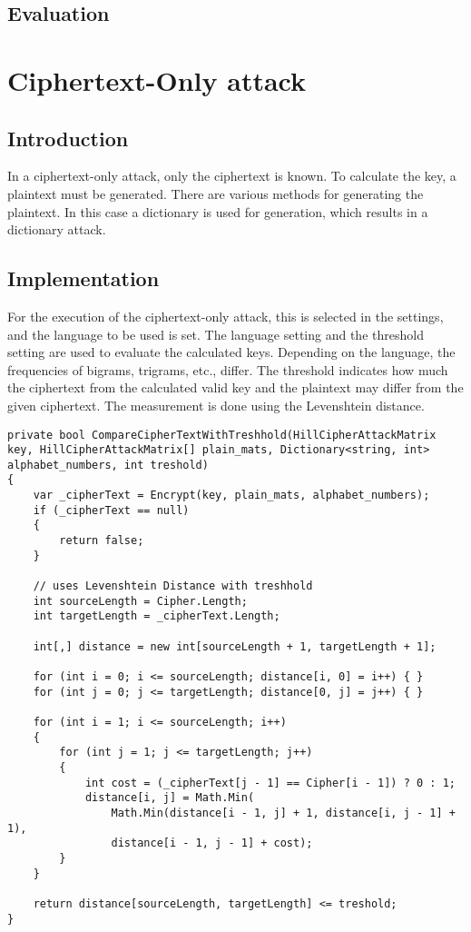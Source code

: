 \documentclass[conference]{IEEEtran}
\begin{document}
\subsection{Evaluation}
\section{Ciphertext-Only attack}
\subsection{Introduction}
In a ciphertext-only attack, only the ciphertext is known. To calculate the key, a plaintext must be generated. There are various methods for generating the plaintext. In this case a dictionary is used for generation, which results in a dictionary attack.
\subsection{Implementation}
For the execution of the ciphertext-only attack, this is selected in the settings, and the language to be used is set. The language setting and the threshold setting are used to evaluate the calculated keys. Depending on the language, the frequencies of bigrams, trigrams, etc., differ. The threshold indicates how much the ciphertext from the calculated valid key and the plaintext may differ from the given ciphertext. The measurement is done using the Levenshtein distance.

\begin{lstlisting}[caption={CompareCipherTextWithTreshhold method}, label={lst:calcDist}]
private bool CompareCipherTextWithTreshhold(HillCipherAttackMatrix key, HillCipherAttackMatrix[] plain_mats, Dictionary<string, int> alphabet_numbers, int treshold)
{
    var _cipherText = Encrypt(key, plain_mats, alphabet_numbers);
    if (_cipherText == null)
    {
        return false;
    }

    // uses Levenshtein Distance with treshhold
    int sourceLength = Cipher.Length;
    int targetLength = _cipherText.Length;

    int[,] distance = new int[sourceLength + 1, targetLength + 1];

    for (int i = 0; i <= sourceLength; distance[i, 0] = i++) { }
    for (int j = 0; j <= targetLength; distance[0, j] = j++) { }

    for (int i = 1; i <= sourceLength; i++)
    {
        for (int j = 1; j <= targetLength; j++)
        {
            int cost = (_cipherText[j - 1] == Cipher[i - 1]) ? 0 : 1;
            distance[i, j] = Math.Min(
                Math.Min(distance[i - 1, j] + 1, distance[i, j - 1] + 1),
                distance[i - 1, j - 1] + cost);
        }
    }

    return distance[sourceLength, targetLength] <= treshold;
}
\end{lstlisting}
\end{document}
